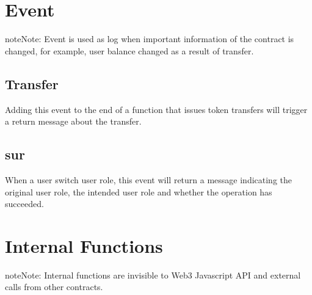 \documentclass[letterpaper,10pt,english]{sphinxmanual}
\begin{document}
\chapter{Event}
\label{\detokenize{index:event}}
\begin{sphinxadmonition}{note}{Note:}
Event is used as log when important information of the contract is changed, for example, user balance changed as a result of transfer.
\end{sphinxadmonition}


\section{Transfer}
\label{\detokenize{index:transfer}}
%
\begin{sphinxVerbatim}[commandchars=\\\{\}]
      
\end{sphinxVerbatim}

Adding this event to the end of a function that issues token transfers will trigger a return message about the transfer.


\section{sur}
\label{\detokenize{index:sur}}
%
\begin{sphinxVerbatim}[commandchars=\\\{\}]
      
\end{sphinxVerbatim}

When a user switch user role, this event will return a message indicating the original user role, the intended user role and whether the operation has succeeded.


\chapter{Internal Functions}
\label{\detokenize{index:internal-functions}}
\begin{sphinxadmonition}{note}{Note:}
Internal functions are invisible to Web3 Javascript API and external calls from other contracts.
\end{sphinxadmonition}
\end{document}
